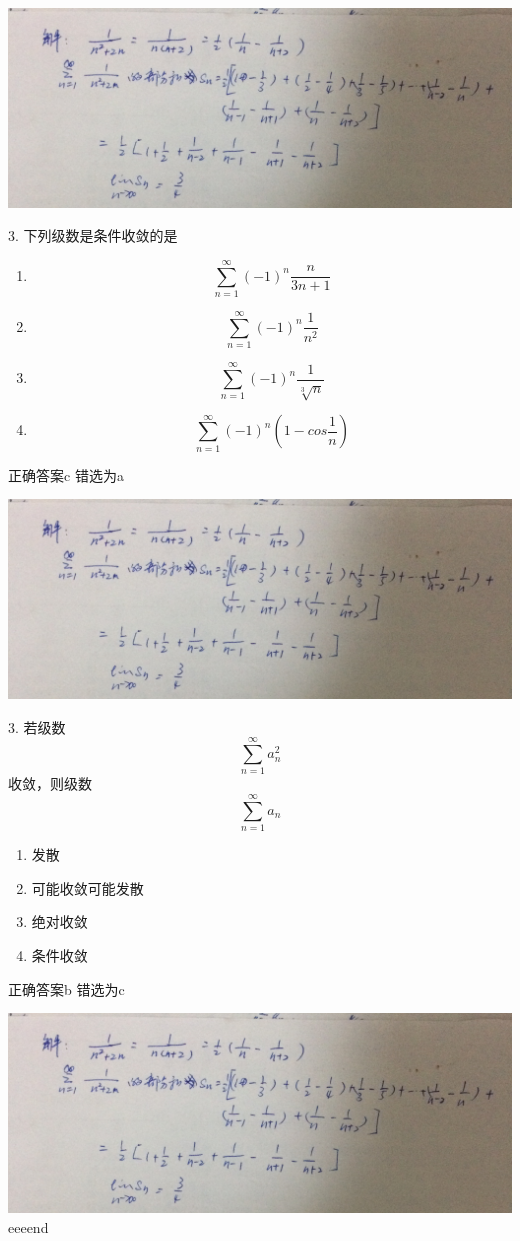 \documentclass[fleqn]{article}
\begin{document}
\begin{flushleft}
\includegraphics[scale=0.1]{31.jpg}

3. 下列级数是条件收敛的是
\begin{enumerate}
	\item $$\sum_{n=1}^{\infty}(-1)^n\frac{n}{3n+1}$$
	\item $$\sum_{n=1}^{\infty}(-1)^n\frac{1}{n^2}$$
	\item $$\sum_{n=1}^{\infty}(-1)^n\frac{1}{\sqrt[3]n}$$
	\item $$\sum_{n=1}^{\infty}(-1)^n (1-cos\frac{1}{n})$$
\end{enumerate}
正确答案c 错选为a

\includegraphics[scale=0.1]{31.jpg}

3. 若级数$$\sum_{n=1}^{\infty}a_n^2$$收敛，则级数 $$\sum_{n=1}^{\infty}a_n$$
\begin{enumerate}
	\item 发散  
	\item 可能收敛可能发散
	\item 绝对收敛
	\item 条件收敛
\end{enumerate}
正确答案b 错选为c

\includegraphics[scale=0.1]{31.jpg}
eeeend
\newpage

\end{flushleft}
\end{document}
